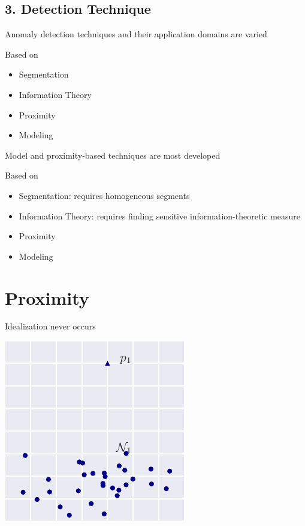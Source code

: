 \documentclass{beamer}
\begin{document}
  \subsection{3. Detection Technique}

  \begin{frame}{Anomaly detection techniques and their application domains are varied}

    Based on
    \begin{itemize}
    \item Segmentation
    \item Information Theory
    \item Proximity 
    \item Modeling
    \end{itemize}

  \end{frame}

  \begin{frame}{Model and proximity-based techniques are most developed}

    Based on
    \begin{itemize}
    \item Segmentation: requires homogeneous segments
    \item Information Theory: requires finding sensitive information-theoretic measure
    \item Proximity
    \item Modeling
    \end{itemize}

  \end{frame}


  \section{Proximity}


  \begin{frame}{Idealization never occurs}

      \centering
      \includegraphics[height=\textheight]{figs/simple_dist.pdf}

  \end{frame}
\end{document}
